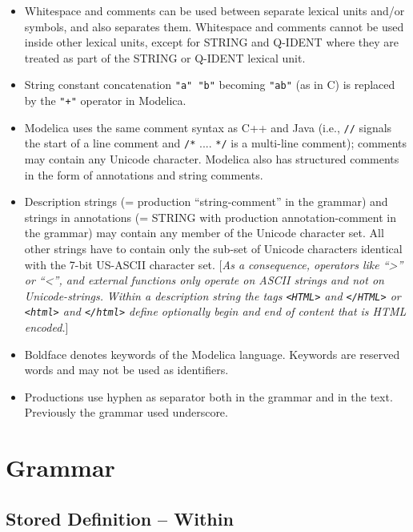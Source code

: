 \begin{itemize}
\item
  Whitespace and comments can be used between separate lexical units
  and/or symbols, and also separates them. Whitespace and comments
  cannot be used inside other lexical units, except for STRING and
  Q-IDENT where they are treated as part of the STRING or Q-IDENT
  lexical unit.
\item
  String constant concatenation \lstinline!"a" "b"! becoming \lstinline!"ab"! (as in C) is
  replaced by the \lstinline!"+"! operator in Modelica.
\item
  Modelica uses the same comment syntax as C++ and Java (i.e., \lstinline!//!
  signals the start of a line comment and \lstinline!/*! .... \lstinline!*/! is a multi-line
  comment); comments may contain any Unicode character. Modelica also
  has structured comments in the form of annotations and string
  comments.
\item
  Description strings (= production ``string-comment'' in the grammar)
  and strings in annotations (= STRING with production annotation-comment in the
  grammar) may contain any member of the Unicode character set. All
  other strings have to contain only the sub-set of Unicode characters
  identical with the 7-bit US-ASCII character set. {[}\emph{As a
  consequence, operators like ``\textgreater{}'' or ``\textless{}'', and
  external functions only operate on ASCII strings and not on
  Unicode-strings.} \emph{Within a description string the tags
  \lstinline!<HTML>! and \lstinline!</HTML>! or
  \lstinline!<html>! and \lstinline!</html>!
  define optionally begin and end of content that is HTML encoded.}{]}
\item
  Boldface denotes keywords of the Modelica language. Keywords are
  reserved words and may not be used as identifiers.
\item
  Productions use hyphen as separator both in the grammar and in the
  text. Previously the grammar used underscore.
\end{itemize}

\section{Grammar}
\subsection{Stored Definition -- Within}


